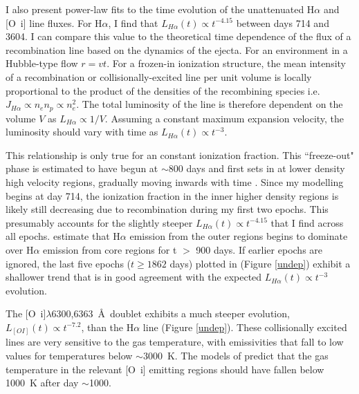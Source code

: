 I also present power-law fits to the time evolution of the unattenuated 
H$\alpha$ and [O~{\sc i}] line fluxes.  For H$\alpha$, I find that 
$L_{H\alpha}(t) \propto t^{-4.15}$ between days 714 and 3604.  I can 
compare this value to the theoretical time dependence of the flux of a 
recombination line based on the dynamics of the ejecta.  For an 
environment in a Hubble-type flow $r=vt$.  For a frozen-in ionization 
structure, the mean intensity of a recombination or collisionally-excited 
line per unit volume is locally proportional to the product of the 
densities of the recombining species i.e. $J_{H\alpha} \propto n_e n_p 
\propto n_e^2$.  The total luminosity of the line is therefore dependent 
on the volume $V$ as $L_{H\alpha} \propto 1/V $.  Assuming a constant 
maximum expansion velocity, the luminosity should vary with time as 
$L_{H\alpha}(t) \propto t^{-3}$.

This relationship is only true for an constant ionization fraction.  This 
``freeze-out" phase is estimated to have begun at $\sim 800$ days and 
first sets in at lower density high velocity regions, gradually moving 
inwards with time \citep{Danziger1991,Fransson1993}.  Since my modelling 
begins at day 714, the ionization fraction in the inner higher density 
regions is likely still decreasing due to recombination during my first 
two epochs.  This presumably accounts for the slightly steeper 
$L_{H\alpha}(t) \propto t^{-4.15}$ that I find across all epochs.  
\citet{Kozma1998b} estimate that H$\alpha$ emission from the outer regions 
begins to dominate over H$\alpha$ emission from core regions for t $>$ 
900 days. If earlier epochs are ignored, the last five epochs ($t \ge 
1862$ days) plotted in (Figure \ref{undep}) exhibit a shallower trend that 
is in good agreement with the expected $L_{H\alpha}(t) \propto t^{-3}$ 
evolution.

The [O~{\sc i}]$\lambda$6300,6363~\AA\ doublet exhibits a much 
steeper evolution, $L_{[OI]}(t) \propto t^{-7.2}$, than the H$\alpha$ line 
(Figure \ref{undep}). These collisionally excited lines are very sensitive 
to the gas temperature, with emissivities that fall to low values for 
temperatures below $\sim$3000~K. The models of \citet{Li1992,Kozma1998a} 
predict that the gas temperature in the relevant [O~{\sc i}] emitting 
regions should have fallen below 1000~K after day $\sim$1000.


